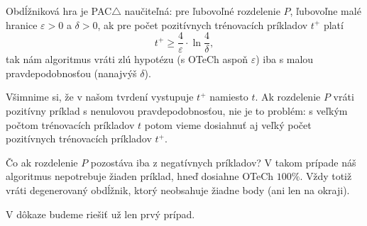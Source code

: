 \begin{theorem}
  Obdĺžniková hra je PAC$\triangle$ naučiteľná: pre ľubovoľné rozdelenie $P$,
  ľubovoľne malé hranice $\varepsilon > 0$ a $\delta > 0$, ak pre počet
  pozitívnych trénovacích príkladov $t^+$ platí
  $$ t^+ \geq \frac{4}{\varepsilon} \cdot \ln{\frac{4}{\delta}}, $$
  tak nám algoritmus vráti zlú hypotézu (s OTeCh aspoň $\varepsilon$)
  iba s malou pravdepodobnosťou (nanajvýš $\delta$).
\end{theorem}

Všimnime si, že v našom tvrdení vystupuje $t^+$ namiesto $t$. Ak
rozdelenie $P$ vráti pozitívny príklad s nenulovou pravdepodobnosťou,
nie je to problém: s veľkým počtom trénovacích príkladov $t$ potom vieme
dosiahnuť aj veľký počet pozitívnych trénovacích príkladov $t^+$.

Čo ak rozdelenie $P$ pozostáva iba z negatívnych príkladov? V takom
prípade náš algoritmus nepotrebuje žiaden príklad, hneď dosiahne OTeCh
$100\%$. Vždy totiž vráti degenerovaný obdĺžnik, ktorý neobsahuje žiadne
body (ani len na okraji).

V dôkaze budeme riešiť už len prvý prípad.

